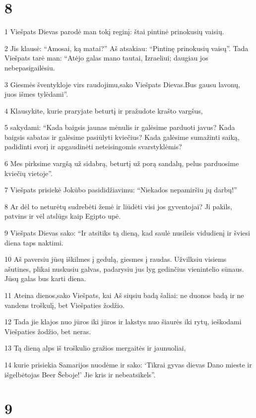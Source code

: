 \chapter{8}


\par 1 Viešpats Dievas parodė man tokį reginį: štai pintinė prinokusių vaisių. 
\par 2 Jis klausė: “Amosai, ką matai?” Aš atsakiau: “Pintinę prinokusių vaisų”. Tada Viešpats tarė man: “Atėjo galas mano tautai, Izraeliui; daugiau jos nebepasigailėsiu. 
\par 3 Giesmės šventykloje virs raudojimu,­sako Viešpats Dievas.­Bus gausu lavonų, juos išmes tylėdami”. 
\par 4 Klausykite, kurie praryjate beturtį ir pražudote krašto vargšus, 
\par 5 sakydami: “Kada baigsis jaunas mėnulis ir galėsime parduoti javus? Kada baigsis sabatas ir galėsime pasiūlyti kviečius? Kada galėsime sumažinti saiką, padidinti svorį ir apgaudinėti neteisingomis svarstyklėmis? 
\par 6 Mes pirksime vargšą už sidabrą, beturtį už porą sandalų, pelus parduosime kviečių vietoje”. 
\par 7 Viešpats prisiekė Jokūbo pasididžiavimu: “Niekados nepamiršiu jų darbų!” 
\par 8 Ar dėl to neturėtų sudrebėti žemė ir liūdėti visi jos gyventojai? Ji pakils, patvins ir vėl atslūgs kaip Egipto upė. 
\par 9 Viešpats Dievas sako: “Ir atsitiks tą dieną, kad saulė nusileis vidudienį ir šviesi diena taps naktimi. 
\par 10 Aš paversiu jūsų iškilmes į gedulą, giesmes į raudas. Užvilksiu visiems ašutines, plikai nuskusiu galvas, padarysiu jus lyg gedinčius vienintelio sūnaus. Jūsų galas bus karti diena. 
\par 11 Ateina dienos,­sako Viešpats,­ kai Aš siųsiu badą šaliai: ne duonos badą ir ne vandens troškulį, bet Viešpaties žodžio. 
\par 12 Tada jie klajos nuo jūros iki jūros ir lakstys nuo šiaurės iki rytų, ieškodami Viešpaties žodžio, bet neras. 
\par 13 Tą dieną alps iš troškulio gražios mergaitės ir jaunuoliai, 
\par 14 kurie prisiekia Samarijos nuodėme ir sako: ‘Tikrai gyvas dievas Dano mieste ir išgelbėtojas Beer Šeboje!’ Jie kris ir nebeatsikels”.



\chapter{9}


